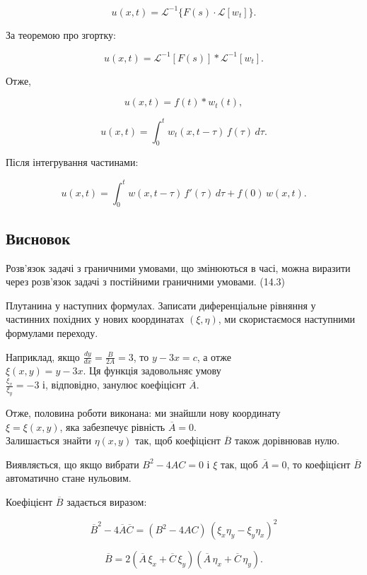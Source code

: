 \documentclass[
  ukrainian,
]{article}
\begin{document}
\[
u(x, t) = \mathcal{L}^{-1}\{F(s)\cdot \mathcal{L}[w_t]\}.
\]

За теоремою про згортку:

\[
u(x, t) = \mathcal{L}^{-1}[F(s)] * \mathcal{L}^{-1}[w_t].
\]

Отже,

\[
u(x, t) = f(t) * w_t(t),
\]

\[
u(x, t) = \int_0^t w_t(x, t-\tau)\, f(\tau)\, d\tau.
\]

Після інтегрування частинами:

\[
u(x, t) = \int_{0}^{t} w(x, t-\tau)\, f'(\tau)\, d\tau + f(0)\, w(x, t).
\]

\subsection{Висновок}\label{ux432ux438ux441ux43dux43eux432ux43eux43a}

Розв'язок задачі з граничними умовами, що змінюються в часі, можна
виразити через розв'язок задачі з постійними граничними умовами. (14.3)

Плутанина у наступних формулах. Записати диференціальне рівняння у
частинних похідних у нових координатах \((\xi, \eta)\), ми скористаємося
наступними формулами переходу.

Наприклад, якщо \(\frac{dy}{dx} = \frac{B}{2A} = 3\), то \(y - 3x = c\),
а отже\\
\(\xi(x, y) = y - 3x\). Ця функція задовольняє умову\\
\(\frac{\xi_x}{\xi_y} = -3\) і, відповідно, занулює коефіцієнт
\(\overline{A}\).

Отже, половина роботи виконана: ми знайшли нову координату\\
\(\xi = \xi(x, y)\), яка забезпечує рівність \(\overline{A} = 0\).\\
Залишається знайти \(\eta(x, y)\) так, щоб коефіцієнт \(\overline{B}\)
також дорівнював нулю.

Виявляється, що якщо вибрати \(B^2 - 4AC = 0\) і \(\xi\) так, щоб
\(\overline{A} = 0\), то коефіцієнт \(\overline{B}\) автоматично стане
нульовим.

Коефіцієнт \(\overline{B}\) задається виразом:

\[
\overline{B}^2 - 4\overline{A}\overline{C} = (B^2 - 4AC)\,(\xi_x \eta_y - \xi_y \eta_x)^2
\]

\[
\overline{B} = 2\left( \overline{A}\,\xi_x + \overline{C}\,\xi_y \right)
\left( \overline{A}\,\eta_x + \overline{C}\,\eta_y \right).
\]
\end{document}
